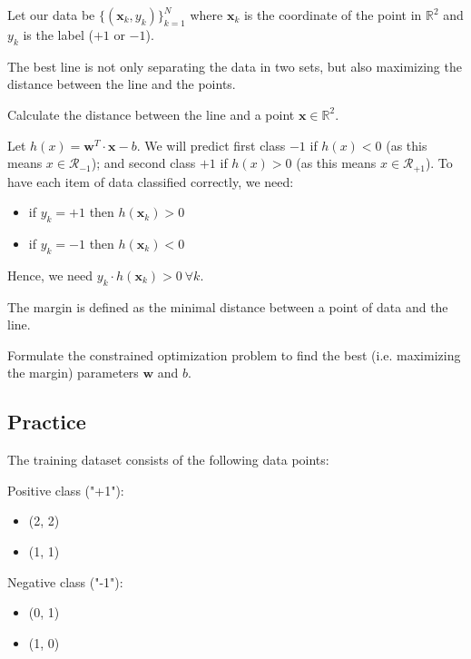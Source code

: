 \documentclass[]{article}
\newcommand{\R}{\mathbb{R}}
\begin{document}
	Let our data be $\{ (\mathbf{x}_k, y_k) \}_{k=1}^N$ where $\mathbf{x}_k$ is the coordinate of the point in $\R^2$ and $y_k$ is the label ($+1$ or $-1$).
	
	The best line is not only separating the data in two sets, but also maximizing the distance between the line and the points.
	
	Calculate the distance between the line and a point $\mathbf{x} \in \R^2$.
	
	\vspace{0.5cm}
	
	Let $h(x) = \mathbf{w}^T\cdot\mathbf{x} - b$.
	We will predict first class $-1$ if $h(x)<0$ (as this means $x \in \mathcal{R}_{-1}$); and second class $+1$ if $h(x)>0$ (as this means $x \in \mathcal{R}_{+1}$).
	To have each item of data classified correctly, we need:
	\begin{itemize}
		\item if $y_k = +1$ then $h(\mathbf{x}_k)>0$
		\item if $y_k = -1$ then $h(\mathbf{x}_k)<0$
	\end{itemize}
	Hence, we need $y_k \cdot h(\mathbf{x}_k) > 0 \ \forall k$.
	
	The margin is defined as the minimal distance between a point of data and the line.
	
	Formulate the constrained optimization problem to find the best (i.e. maximizing the margin) parameters $\mathbf{w}$ and $b$.
	
	
	
	\subsection{Practice}
	The training dataset consists of the following data points:
	
	Positive class ("+1"):
	\begin{itemize}
		\item (2, 2)
		\item (1, 1)
	\end{itemize}
	Negative class ("-1"):
	\begin{itemize}
		\item (0, 1)
		\item (1, 0)
	\end{itemize}
	
\end{document}
